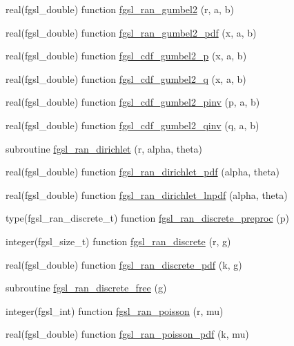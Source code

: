 \begin{DoxyCompactItemize}
\item 
real(fgsl\+\_\+double) function \hyperlink{rng_8finc_a8df69840fa11815cfe3c2a5f75e70140}{fgsl\+\_\+ran\+\_\+gumbel2} (r, a, b)
\item 
real(fgsl\+\_\+double) function \hyperlink{rng_8finc_a4064ea0290a475c5d6fc4a09767c6246}{fgsl\+\_\+ran\+\_\+gumbel2\+\_\+pdf} (x, a, b)
\item 
real(fgsl\+\_\+double) function \hyperlink{rng_8finc_aeff0eee0d72c27030164d5c6cb80a06c}{fgsl\+\_\+cdf\+\_\+gumbel2\+\_\+p} (x, a, b)
\item 
real(fgsl\+\_\+double) function \hyperlink{rng_8finc_a3f716068beb8b0ed9023bac7a11077fc}{fgsl\+\_\+cdf\+\_\+gumbel2\+\_\+q} (x, a, b)
\item 
real(fgsl\+\_\+double) function \hyperlink{rng_8finc_aea4916d5cd9092eacf4c3dc7662614c9}{fgsl\+\_\+cdf\+\_\+gumbel2\+\_\+pinv} (p, a, b)
\item 
real(fgsl\+\_\+double) function \hyperlink{rng_8finc_ab0d909e722676fc110f8f44378006c07}{fgsl\+\_\+cdf\+\_\+gumbel2\+\_\+qinv} (q, a, b)
\item 
subroutine \hyperlink{rng_8finc_a73aba9b9dc68ab325ad7074c101dbda8}{fgsl\+\_\+ran\+\_\+dirichlet} (r, alpha, theta)
\item 
real(fgsl\+\_\+double) function \hyperlink{rng_8finc_ab1baa412c299444df3ffd79561f0863b}{fgsl\+\_\+ran\+\_\+dirichlet\+\_\+pdf} (alpha, theta)
\item 
real(fgsl\+\_\+double) function \hyperlink{rng_8finc_a9a557e6292bddfae3ee47d4c4f35d89b}{fgsl\+\_\+ran\+\_\+dirichlet\+\_\+lnpdf} (alpha, theta)
\item 
type(fgsl\+\_\+ran\+\_\+discrete\+\_\+t) function \hyperlink{rng_8finc_a503addce2caaf85cb54a1c0db960f106}{fgsl\+\_\+ran\+\_\+discrete\+\_\+preproc} (p)
\item 
integer(fgsl\+\_\+size\+\_\+t) function \hyperlink{rng_8finc_aefc716ef88ffa6cc65fa6282c31dd0f0}{fgsl\+\_\+ran\+\_\+discrete} (r, g)
\item 
real(fgsl\+\_\+double) function \hyperlink{rng_8finc_a156d8a091be2738deec0f2f1b95dfd8a}{fgsl\+\_\+ran\+\_\+discrete\+\_\+pdf} (k, g)
\item 
subroutine \hyperlink{rng_8finc_ac738587037bec690a44a21b02f02e2fc}{fgsl\+\_\+ran\+\_\+discrete\+\_\+free} (g)
\item 
integer(fgsl\+\_\+int) function \hyperlink{rng_8finc_a74186f6416a6812b1e4316ed93dd4219}{fgsl\+\_\+ran\+\_\+poisson} (r, mu)
\item 
real(fgsl\+\_\+double) function \hyperlink{rng_8finc_a8c8223415cae86ff6f8547a1487fdf84}{fgsl\+\_\+ran\+\_\+poisson\+\_\+pdf} (k, mu)

\end{DoxyCompactItemize}
